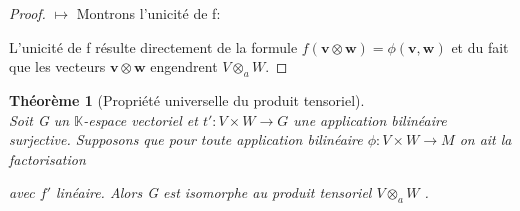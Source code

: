 \documentclass[11pt,a4paper,oneside]{book}
\newtheorem{theo}{Théorème}[chapter]
\newtheorem{proof}{Démonstration}
\def\K{\mathbb K}
\def\v{\mathbf v}
\def\w{\mathbf w}
\begin{document}
\begin{proof}
$ \mapsto $ Montrons l'unicité de f:

L'unicité de f résulte directement de la formule $ f(\v\otimes \w)=\phi(\v,\w)$ et du fait que les vecteurs $ \v\otimes \w $ engendrent $ V\otimes_{a} W.$
\end{proof}

\begin{theo}[Propriété universelle du produit tensoriel]\label{theo1.3}\emph{\\}
Soit G un $ \K $-espace vectoriel et $ t': V\times W\rightarrow G  $ une application bilinéaire surjective. Supposons que pour toute application bilinéaire $ \phi :V\times W\rightarrow M $ on ait la factorisation 
	\begin{center}
\end{center}
avec $ f' $ linéaire. Alors G est isomorphe au produit tensoriel $ V\otimes_{a} W $ \cite[p.102]{Michel2013}.
\end{theo}
\end{document}
